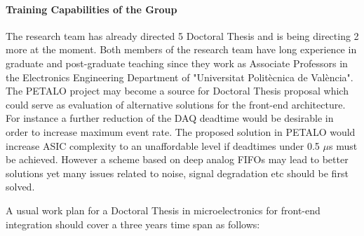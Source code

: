 \paragraph{Training Capabilities of the Group}
\par The research team has already directed 5 Doctoral Thesis and is being directing 2 more at the moment. Both members of the research team have long experience in graduate and post-graduate teaching since they work as Associate Professors in the Electronics Engineering Department of "Universitat Politècnica de València". The PETALO project may become a source for Doctoral Thesis proposal which could serve as evaluation of alternative solutions for the front-end architecture. For instance a further reduction of the DAQ deadtime would be desirable in order to increase maximum event rate. The proposed solution in PETALO would increase ASIC complexity to an unaffordable level if deadtimes under 0.5 $\mu$s must be achieved. However a scheme based on deep analog FIFOs may lead to better solutions yet many issues related to noise, signal degradation etc should be first solved.
\par A usual work plan for a Doctoral Thesis in microelectronics for front-end integration should cover a three years time span as follows:
